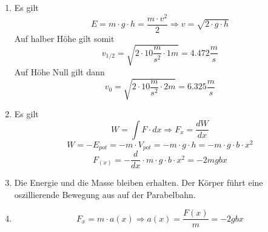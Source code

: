 \documentclass[12pt,a4paper,ngerman]{article}
\begin{document}
\begin{enumerate}
\item Es gilt
\begin{equation*}
E = m \cdot g \cdot h = \frac{m \cdot v^2}{2} \Rightarrow v = \sqrt{2 \cdot g \cdot h}
\end{equation*}
Auf halber Höhe gilt somit
\begin{equation*}
v_{1/2} = \sqrt{2 \cdot 10 \frac{m}{s^2} \cdot 1m} = 4.472 \frac{m}{s}
\end{equation*}
Auf Höhe Null gilt dann
\begin{equation*}
v_{0} = \sqrt{2 \cdot 10 \frac{m}{s^2} \cdot 2m} = 6.325 \frac{m}{s}
\end{equation*}
\item Es gilt
\begin{equation*}
W = \int{F \cdot dx} \Rightarrow F_x = \frac{dW}{dx}
\end{equation*}
\begin{equation*}
W = -E_{pot} = -m \cdot V_{pot} = -m\cdot g\cdot h = -m \cdot g \cdot b \cdot x^2
\end{equation*}
\begin{equation*}
F_{(x)} = -\frac{d}{dx}\cdot m \cdot g \cdot b\cdot x^2 = -2mgbx
\end{equation*}
\item Die Energie und die Masse bleiben erhalten. Der Körper führt eine oszillierende Bewegung aus auf der Parabelbahn. 
\item \begin{equation}
F_{x} = m \cdot a(x) \Rightarrow a(x) = \frac{F(x)}{m} = -2gbx
\end{equation}
\end{enumerate}












 



   
\end{document}
